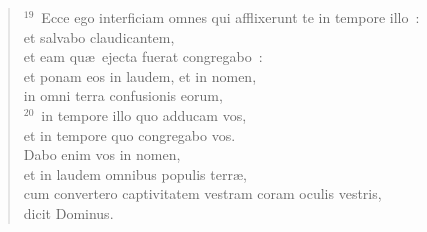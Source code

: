 \begin{flushleft}
\begin{verse}
${}^{19}$~Ecce ego interficiam omnes qui afflixerunt te in tempore illo~:\\ et salvabo claudicantem,\\ et eam qu\ae\ ejecta fuerat congregabo~:\\ et ponam eos in laudem, et in nomen,\\ in omni terra confusionis eorum,\\
${}^{20}$~in tempore illo quo adducam vos,\\ et in tempore quo congregabo vos.\\ Dabo enim vos in nomen,\\ et in laudem omnibus populis terr\ae ,\\ cum convertero captivitatem vestram coram oculis vestris,\\ dicit Dominus.\end{verse}\end{flushleft}


